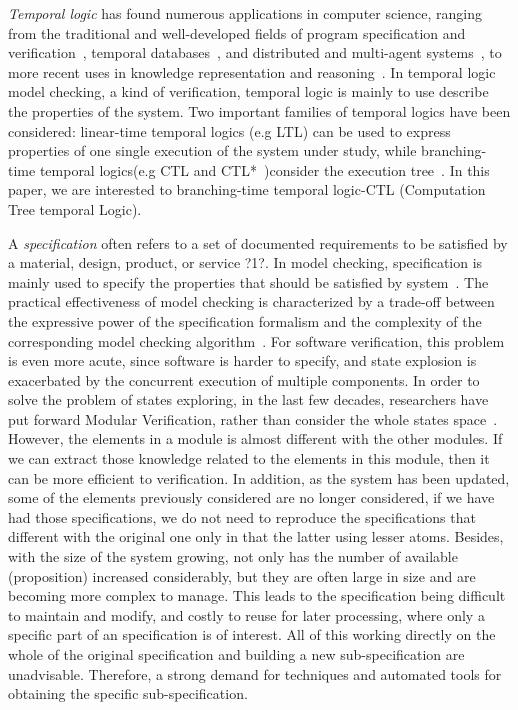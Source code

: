 \documentclass{article}
\begin{document}
 \emph{Temporal logic} has found numerous applications in computer science, ranging from the traditional and well-developed fields of program specification and verification~\cite{manna1995temporal,pnueli1992temporal,pnueli1986applications}, temporal databases~\cite{chomicki1994temporal,chomicki1995feasibility,abiteboul1996temporal,sernadas1980temporal}, and distributed and multi-agent systems~\cite{fagin2004reasoning}, to more recent uses in knowledge representation and reasoning~\cite{schild1993combining,baader1995multi,hodkinson2000decidable}. In temporal logic model checking, a kind of verification, temporal logic is mainly to use describe the properties of the system. Two important families of temporal logics have been considered: linear-time temporal logics (e.g LTL\cite{pnueli1977temporal}) can be used to express properties of one single execution of the system under study, while branching-time temporal logics(e.g CTL\cite{clarke1981design} and CTL*~\cite{emerson1986sometimes})consider the execution tree~\cite{laroussinie2014quantified}. In this paper, we are interested to branching-time temporal logic-CTL (Computation Tree temporal Logic).

 A \emph{specification} often refers to a set of documented requirements to be satisfied by a material, design, product, or service ?1?. In model checking, specification is mainly used to specify the properties that should be satisfied by system~\cite{chaki2005concurrent,chaki2004expressive,clarke1994model,ghosh2016arsenal}. The practical effectiveness of model checking is characterized by a trade-off between the expressive power of the specification formalism and the complexity of the corresponding model checking algorithm~\cite{chaki2004expressive}. For software verification, this problem is even more acute, since software is harder to specify, and state explosion is exacerbated by the concurrent execution of multiple components. In order to solve the problem of states exploring, in the last few decades, researchers have put forward Modular Verification, rather than consider the whole states space~\cite{chaki2005concurrent,chaki2004expressive}. However, the elements in a module is almost different with the other modules. If we can extract those knowledge related to the elements in this module, then it can be more efficient to verification. In addition, as the system has been updated, some of the elements previously considered are no longer considered, if we have had those specifications, we do not need to reproduce the specifications that different with the original one only in that the latter using lesser atoms. Besides, with the size of the system growing, not only has the number of available (proposition) increased considerably, but they are often large in size and are becoming more complex to manage. This leads to the specification being difficult to maintain and modify, and costly to reuse for later processing, where only a specific part of an specification is of interest. All of this working directly on the whole of the original specification and building a new sub-specification are unadvisable. Therefore, a strong demand for techniques and automated tools for obtaining the specific sub-specification.
\end{document}
